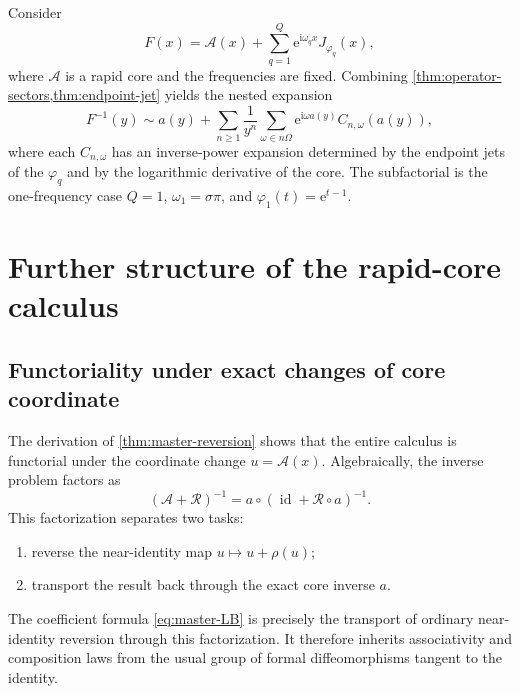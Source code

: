 \documentclass[11pt,a4paper]{article}
\numberwithin{equation}{section}
\theoremstyle{definition}
\theoremstyle{remark}
\newcommand{\e}{\mathrm e}
\newcommand{\ii}{\mathrm i}
\newcommand{\Core}{\mathcal A}
\newcommand{\Res}{\mathcal R}
\begin{document}
Consider
\begin{equation}\label{eq:gamma-endpoint-family}
 F(x)=\Core(x)+\sum_{q=1}^{Q}
 \e^{\ii\omega_q x}J_{\varphi_q}(x),
\end{equation}
where $\Core$ is a rapid core and the frequencies are fixed.  Combining
\cref{thm:operator-sectors,thm:endpoint-jet} yields the nested expansion
\begin{equation}\label{eq:gamma-endpoint-inverse}
 F^{-1}(y)\sim a(y)+\sum_{n\ge1}\frac1{y^n}
 \sum_{\omega\in n\Omega}
 \e^{\ii\omega a(y)}C_{n,\omega}(a(y)),
\end{equation}
where each $C_{n,\omega}$ has an inverse-power expansion determined by the
endpoint jets of the $\varphi_q$ and by the logarithmic derivative of the
core.  The subfactorial is the one-frequency case
$Q=1$, $\omega_1=\sigma\pi$, and
$\varphi_1(t)=\e^{t-1}$.

\section{Further structure of the rapid-core calculus}
\label{sec:further-structure}

\subsection{Functoriality under exact changes of core coordinate}

The derivation of \cref{thm:master-reversion} shows that the entire calculus
is functorial under the coordinate change $u=\Core(x)$.  Algebraically, the
inverse problem factors as
\begin{equation}\label{eq:factorization}
 (\Core+\Res)^{-1}
 =a\circ(\operatorname{id}+\Res\circ a)^{-1}.
\end{equation}
This factorization separates two tasks:

\begin{enumerate}
\item reverse the near-identity map $u\mapsto u+\rho(u)$;
\item transport the result back through the exact core inverse $a$.
\end{enumerate}

The coefficient formula \eqref{eq:master-LB} is precisely the transport of
ordinary near-identity reversion through this factorization.  It therefore
inherits associativity and composition laws from the usual group of formal
diffeomorphisms tangent to the identity.
\end{document}
